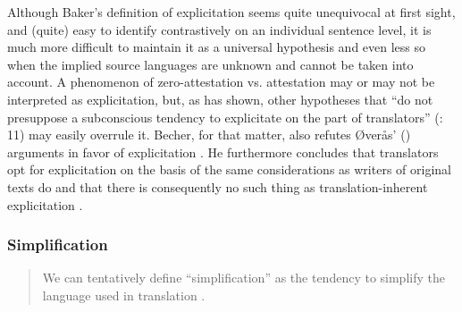 Although Baker’s definition of explicitation seems quite unequivocal at first sight, and (quite) easy to identify contrastively on an individual sentence level, it is much more difficult to maintain it as a universal hypothesis and even less so when the implied source languages are unknown and cannot be taken into account. A phenomenon of zero-attestation vs. attestation may or may not be interpreted as explicitation, but, as \citet{becher_abandoning_2010} has shown, other hypotheses that “do not presuppose a subconscious tendency to explicitate on the part of translators” (\citeyear{becher_abandoning_2010}: 11) may easily overrule it. Becher, for that matter, also refutes Øverås’ (\citeyear{overas_search_1998}) arguments in favor of explicitation \citep[12-16]{becher_abandoning_2010}. He furthermore concludes that translators opt for explicitation on the basis of the same considerations as writers of original texts do and that there is consequently no such thing as translation-inherent explicitation \citep[22-23]{becher_abandoning_2010}.

\subsubsection{Simplification}
\label{sec:2.2.2.2}  
\begin{quote}
We can tentatively define “simplification” as the tendency to simplify the language used in translation \citep[181]{baker_corpus-based_1996}.
\end{quote}


